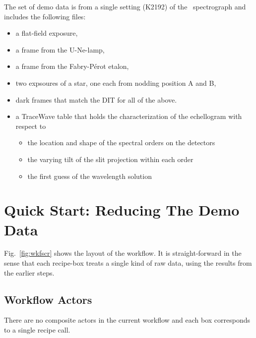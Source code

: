 \documentclass[pdftex,a4paper,twoside,11pt]{article}
\begin{document}
The set of demo data is from a single setting (K2192) of the \instrument\ spectrograph
and includes the following files:
\begin{itemize}
  \item a flat-field exposure,
  \item a frame from the U-Ne-lamp,
  \item a frame from the Fabry-Pérot etalon,
  \item two expsoures of a star, one each from nodding position A and B,
  \item dark frames that match the DIT for all of the above.
  \item a TraceWave table that holds the characterization of the echellogram with respect to
  \begin{itemize}
    \item the location and shape of the spectral orders on the detectors
    \item the varying tilt of the slit projection within each order
    \item the first guess of the wavelength solution
  \end{itemize}
\end{itemize}


\section{Quick Start: Reducing The Demo Data \label{sec:quick_start}}



Fig.~\ref{fig:wkfscr} shows the layout of the workflow. It is straight-forward
in the sense that each recipe-box treats a single kind of raw data, using the
results from the earlier steps.



\subsection{Workflow Actors}

There are no composite actors in the current workflow
and each box corresponds to a single recipe call.







%
\end{document}
